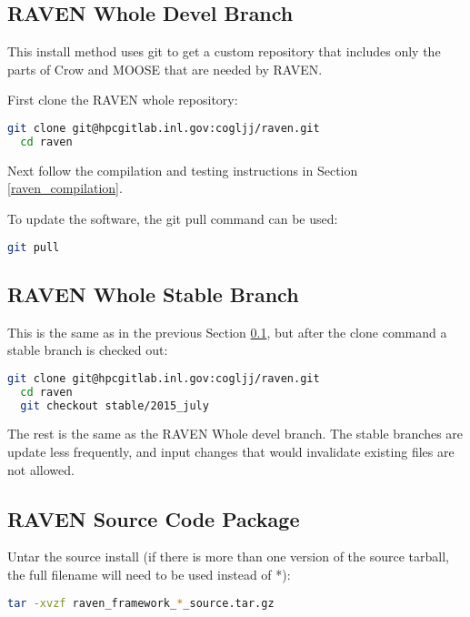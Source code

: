\subsection{RAVEN Whole Devel Branch}
\label{raven_whole_devel}

This install method uses git to get a custom repository that includes
only the parts of Crow and MOOSE that are needed by RAVEN.

First clone the RAVEN whole repository:

\begin{lstlisting}[language=bash]
  git clone git@hpcgitlab.inl.gov:cogljj/raven.git
  cd raven
\end{lstlisting}

Next follow the compilation and testing instructions in Section \ref{raven_compilation}.

To update the software, the git pull command can be used:

\begin{lstlisting}[language=bash]
  git pull
\end{lstlisting}

\subsection{RAVEN Whole Stable Branch}
\label{raven_whole_stable}

This is the same as in the previous Section \ref{raven_whole_devel},
but after the clone command a stable branch is checked out:

\begin{lstlisting}[language=bash]
  git clone git@hpcgitlab.inl.gov:cogljj/raven.git
  cd raven
  git checkout stable/2015_july
\end{lstlisting}

The rest is the same as the RAVEN Whole devel branch.  The stable
branches are update less frequently, and input changes that would
invalidate existing files are not allowed.

\subsection{RAVEN Source Code Package}
\label{raven_source_package}

Untar the source install (if there is more than one version of the
source tarball, the full filename will need to be used instead of *):

\begin{lstlisting}[language=bash]
tar -xvzf raven_framework_*_source.tar.gz
\end{lstlisting}


